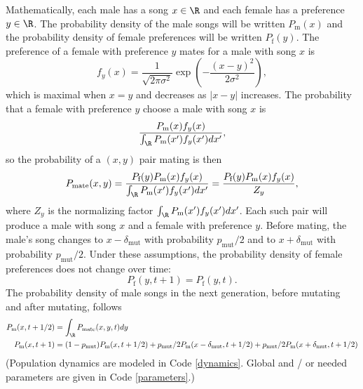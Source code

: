 \documentclass{article}\usepackage[]{graphicx}\usepackage[]{color}
\begin{document}
Mathematically, each male has a song $x\in \R$ and each female has a preference $y\in\R$. The probability density of the male songs will be written $P_\text{m}(x)$ and the probability density of female preferences will be written $P_\text{f}(y)$. The preference of a female with preference $y$ mates for a male with song $x$ is 
\begin{equation*}
f_y(x)=\frac{1}{\sqrt{2 \pi \sigma^2}}\exp\left(-\frac{(x-y)^2}{2\sigma^2}\right),
\end{equation*}
which is maximal when $x=y$ and decreases as $|x-y|$ increases. The probability that a female with preference $y$ choose a male with song $x$ is 
\begin{equation*}
\frac{P_\text{m}(x)f_y(x)}{\int_\R P_\text{m}(x')f_y(x')dx'},
\end{equation*}
so the probability of a $(x,y)$ pair mating is then
\begin{equation*}
P_\text{mate}(x,y)=\frac{P_\text{f}(y)P_\text{m}(x)f_y(x)}{\int_\R P_\text{m}(x')f_y(x')dx'}=\frac{P_\text{f}(y)P_\text{m}(x)f_y(x)}{Z_y},
\end{equation*}
where $Z_y$ is the normalizing factor $\int_\R P_\text{m}(x')f_y(x')dx'$.
Each such pair will produce a male with song $x$ and a female with preference $y$. Before mating, the male's song changes to $x-\delta_\text{mut}$ with probability $p_\text{mut}/2$ and to $x+\delta_\text{mut}$ with probability $p_\text{mut}/2$. Under these assumptions, the probability density of female preferences does not change over time:
\begin{equation*}
P_\text{f}(y,t+1)=P_\text{f}(y,t).
\end{equation*}
The probability density of male songs in the next generation, before mutating and after mutating, follows
\begin{align*}
P_\text{m}(x,t+1/2)&=\int_\R P_\text{mate}(x,y,t) dy
\\P_\text{m}(x,t+1)&=(1-p_\text{mut})P_\text{m}(x,t+1/2)+p_\text{mut}/2P_\text{m}(x-\delta_\text{mut},t+1/2)+p_\text{mut}/2P_\text{m}(x+\delta_\text{mut},t+1/2)
\end{align*}
 (Population dynamics are modeled in Code \ref{dynamics}. Global and / or needed parameters are given in Code \ref{parameters}.)
\end{document}
